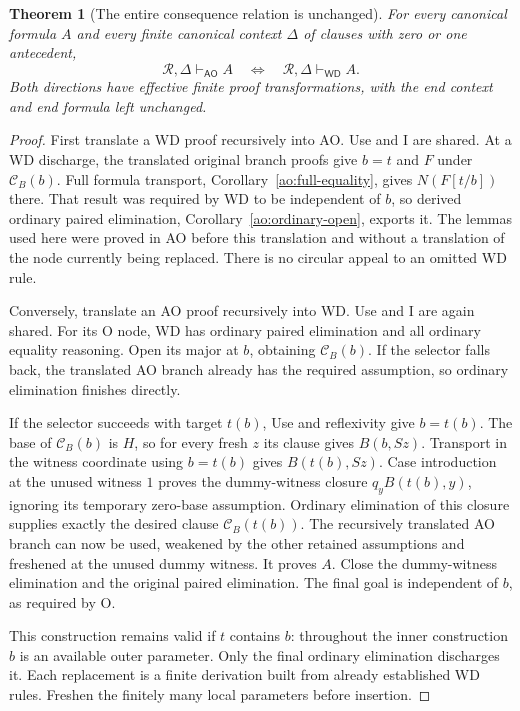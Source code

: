 \documentclass[11pt,letterpaper]{article}
\newtheorem{theorem}{Theorem}[section]
\theoremstyle{definition}
\begin{document}
\begin{theorem}[The entire consequence relation is unchanged]
\label{ao:equivalence}
For every canonical formula $A$ and every finite canonical context
$\Delta$ of clauses with zero or one antecedent,
\[
 \mathcal R,\Delta\vdash_{\mathsf{AO}}A
 \quad\Longleftrightarrow\quad
 \mathcal R,\Delta\vdash_{\mathsf{WD}}A.
\]
Both directions have effective finite proof transformations, with the
end context and end formula left unchanged.
\end{theorem}
\begin{proof}
First translate a WD proof recursively into AO.  Use and I are shared.
At a WD discharge, the translated original branch proofs give $b=t$
and $F$ under $\mathcal C_B(b)$.  Full formula transport,
Corollary~\ref{ao:full-equality}, gives $N(F[t/b])$ there.  That result
was required by WD to be independent of $b$, so derived ordinary paired
elimination, Corollary~\ref{ao:ordinary-open}, exports it.  The lemmas
used here were proved in AO before this translation and without a
translation of the node currently being replaced.  There is no circular
appeal to an omitted WD rule.

Conversely, translate an AO proof recursively into WD.  Use and I are
again shared.  For its O node, WD has ordinary paired elimination and
all ordinary equality reasoning.  Open its major at $b$, obtaining
$\mathcal C_B(b)$.  If the selector falls back, the translated AO
branch already has the required assumption, so ordinary elimination
finishes directly.

If the selector succeeds with target $t(b)$, Use and reflexivity give
$b=t(b)$.  The base of $\mathcal C_B(b)$ is $H$, so for every fresh
$z$ its clause gives $B(b,Sz)$.  Transport in the witness coordinate
using $b=t(b)$ gives $B(t(b),Sz)$.  Case introduction at the unused
witness $1$ proves the dummy-witness closure
$q_y B(t(b),y)$, ignoring its temporary zero-base assumption.  Ordinary
elimination of this closure supplies exactly the desired clause
$\mathcal C_B(t(b))$.  The recursively translated AO branch can now
be used, weakened by the other retained assumptions and freshened at
the unused dummy witness.  It proves $A$.  Close the dummy-witness
elimination and the original paired elimination.  The final goal is
independent of $b$, as required by O.

This construction remains valid if $t$ contains $b$: throughout the
inner construction $b$ is an available outer parameter.  Only the final
ordinary elimination discharges it.  Each replacement is a finite
derivation built from already established WD rules.  Freshen the finitely
many local parameters before insertion.
\end{proof}
\end{document}
